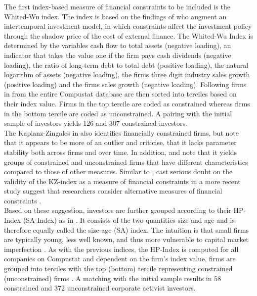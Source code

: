 \documentclass[12pt]{article}
\begin{document}
The first index-based measure of financial constraints to be included is the Whited-Wu index. The index is based on the findings of \citet[p.543]{Whited2006} who augment an intertemporal investment model, in which constraints affect the investment policy through the shadow price of the cost of external finance. The Whited-Wu Index is determined by the variables cash flow to total assets (negative loading), an indicator that takes the value one if the firm pays cash dividends (negative loading), the ratio of long-term debt to total debt (positive loading), the natural logarithm of assets (negative loading), the firms three digit industry sales growth (positive loading) and the firms sales growth (negative loading). Following \citet[p.38]{Farre-mensa2013} firms in from the entire Compustat database are then sorted into terciles based on their index value. Firms in the top tercile are coded as constrained whereas firms in the bottom tercile are coded as unconstrained. A pairing with the initial sample of investors yields 126 and 307 constrained investors.\\
The Kaplanz-Zingales in \citet{as} also identifies financially constrained firms, but \citet[p.29]{Farre-mensa2013} note that it appears to be more of an outlier and \citet{Whited2006} criticise, that it lacks parameter stability both across firms and over time. In addition, \citet[p.111]{Khatami2014} and \citet[p.1779]{Almeida2004} note that it yields groups of constrained and unconstrained firms that have different characteristics compared to those of other measures. Similar to \citet[p.546]{Whited2006}, \citet[p.1909]{hadlock2010} cast serious doubt on the validity of the KZ-index as a measure of financial constraints in a more recent study suggest that researchers consider alternative measures of financial constraints \citep[p.1938]{hadlock2010}.\\
Based on these suggestion, investors are further grouped according to their HP-Index (SA-Index) as in \citet{hadlock2010}. It consists of the two quantities size and age and is therefore equally called the size-age (SA) index. The intuition is that small firms are typically young, less well known, and thus more vulnerable to capital market imperfection \citep[p.1790]{almeida}. As with the previous indices, the HP-Index is computed for all companies on Compustat and dependent on the firm's index value, firms are grouped into terciles with the top (bottom) tercile representing constrained (unconstrained) firms \citep[p.29]{Farre-mensa2013}. A matching with the initial sample results in 58 constrained and 372 unconstrained corporate activist investors. 
\end{document}

